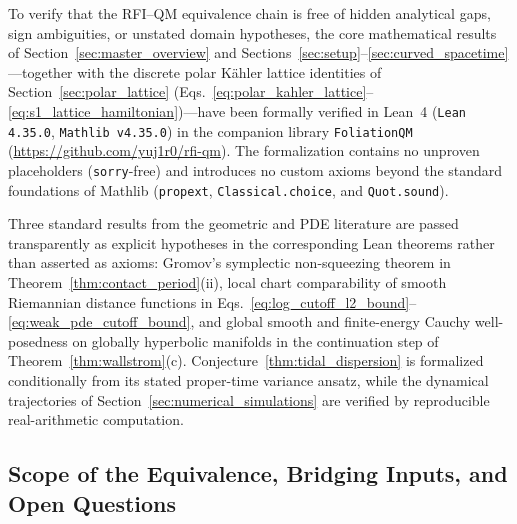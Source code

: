 \documentclass[11pt, a4paper]{article}
\theoremstyle{definition}
\begin{document}
To verify that the RFI--QM equivalence chain is free of hidden analytical gaps, sign ambiguities, or unstated domain hypotheses, the core mathematical results of Section~\ref{sec:master_overview} and Sections~\ref{sec:setup}--\ref{sec:curved_spacetime}---together with the discrete polar K\"{a}hler lattice identities of Section~\ref{sec:polar_lattice} (Eqs.~\eqref{eq:polar_kahler_lattice}--\eqref{eq:s1_lattice_hamiltonian})---have been formally verified in Lean~4 (\texttt{Lean 4.35.0}, \texttt{Mathlib v4.35.0}) in the companion library \texttt{FoliationQM} (\url{https://github.com/yuj1r0/rfi-qm}). The formalization contains no unproven placeholders (\texttt{sorry}-free) and introduces no custom axioms beyond the standard foundations of Mathlib (\texttt{propext}, \texttt{Classical.choice}, and \texttt{Quot.sound}).

Three standard results from the geometric and PDE literature are passed transparently as explicit hypotheses in the corresponding Lean theorems rather than asserted as axioms: Gromov's symplectic non-squeezing theorem \cite{Gromov1985} in Theorem~\ref{thm:contact_period}(ii), local chart comparability of smooth Riemannian distance functions in Eqs.~\eqref{eq:log_cutoff_l2_bound}--\eqref{eq:weak_pde_cutoff_bound}, and global smooth and finite-energy Cauchy well-posedness on globally hyperbolic manifolds \cite{BarGinouxPfaffle2007, Bar2015} in the continuation step of Theorem~\ref{thm:wallstrom}(c). Conjecture~\ref{thm:tidal_dispersion} is formalized conditionally from its stated proper-time variance ansatz, while the dynamical trajectories of Section~\ref{sec:numerical_simulations} are verified by reproducible real-arithmetic computation.

\subsection{Scope of the Equivalence, Bridging Inputs, and Open Questions}
\label{sec:open_questions}
\end{document}
